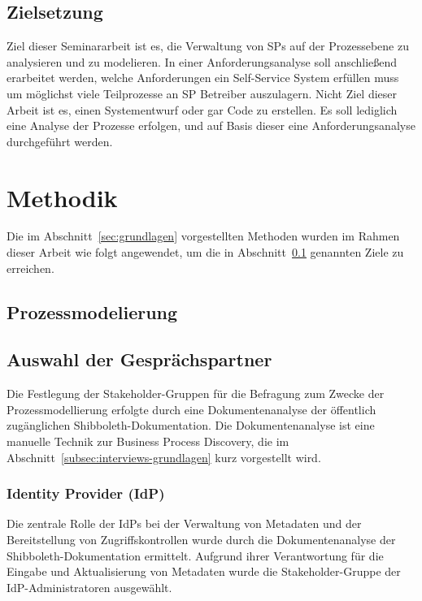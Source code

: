 \documentclass[a4paper, fontsize=11pt]{scrartcl}
\begin{document}
\subsection{Zielsetzung}\label{subsec:zielsetzung}
Ziel dieser Seminararbeit ist es, die Verwaltung von SPs auf der Prozessebene zu analysieren und zu modelieren.
In einer Anforderungsanalyse soll anschließend erarbeitet werden, welche Anforderungen ein Self-Service System erfüllen muss um möglichst viele Teilprozesse an SP Betreiber auszulagern.
Nicht Ziel dieser Arbeit ist es, einen Systementwurf oder gar Code zu erstellen.
Es soll lediglich eine Analyse der Prozesse erfolgen, und auf Basis dieser eine Anforderungsanalyse durchgeführt werden.




\section{Methodik}\label{sec:methodik}
Die im Abschnitt~\ref{sec:grundlagen} vorgestellten Methoden wurden im Rahmen dieser Arbeit wie folgt angewendet, um die in Abschnitt~\ref{subsec:zielsetzung} genannten Ziele zu erreichen.
\subsection{Prozessmodelierung}\label{subsec:prozessmodelierung-methodik}
\subsection{Auswahl der Gesprächspartner}\label{subsubsec:auswahl-gespraechspartner}
Die Festlegung der Stakeholder-Gruppen für die Befragung zum Zwecke der Prozessmodellierung erfolgte durch eine Dokumentenanalyse der öffentlich zugänglichen Shibboleth-Dokumentation. 
Die Dokumentenanalyse ist eine manuelle Technik zur Business Process Discovery, die im Abschnitt~\ref{subsec:interviews-grundlagen} kurz vorgestellt wird. 

\subsubsection{Identity Provider (IdP)}
Die zentrale Rolle der IdPs bei der Verwaltung von Metadaten und der Bereitstellung von Zugriffskontrollen wurde durch die Dokumentenanalyse der Shibboleth-Dokumentation ermittelt. 
Aufgrund ihrer Verantwortung für die Eingabe und Aktualisierung von Metadaten wurde die Stakeholder-Gruppe der IdP-Administratoren ausgewählt.
\end{document}
